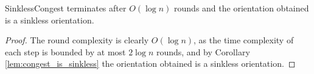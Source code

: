 \begin{theorem}
	SinklessCongest terminates after $O(\log{n})$ rounds and  the orientation obtained is a sinkless orientation.  
\end{theorem}
\begin{proof}
	The round complexity is clearly $O(\log{n})$, as the time complexity of each step is bounded by at most $2\log{n}$ rounds, and by Corollary \ref{lem:congest_is_sinkless} the orientation obtained is a sinkless orientation.   
\end{proof}